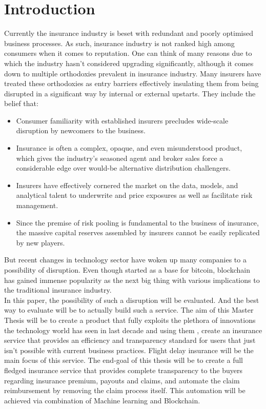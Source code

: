 \chapter{Introduction}

Currently the insurance industry is beset with redundant and poorly optimised business processes. As such, insurance industry is not ranked high among consumers when it comes to reputation\cite{lauraMazzucaToops2014HarrisPropertyCasualty360}. One can think of many reasons due to which the industry hasn't considered upgrading significantly, although it comes down to multiple orthodoxies prevalent in insurance industry. Many insurers have treated these orthodoxies as entry barriers effectively insulating them from being disrupted in a significant way by internal or external upstarts. They include the belief that\cite{Shaw2016InsurersDisrupted}:
\begin{itemize}
    \item Consumer familiarity with established insurers precludes wide-scale disruption by newcomers to the business.
    \item Insurance is often a complex, opaque, and even misunderstood product, which gives the industry’s seasoned agent and broker sales force a considerable edge over would-be alternative distribution challengers.
    \item Insurers have effectively cornered the market on the data, models, and analytical talent to underwrite and price exposures as well as facilitate risk management.
    \item Since the premise of risk pooling is fundamental to the business of insurance, the massive capital reserves assembled by insurers cannot be easily replicated by new players.
\end{itemize}

But recent changes in technology sector have woken up many companies to a possibility of disruption. Even though started as a base for bitcoin, blockchain has gained immense popularity as the next big thing with various implications to the traditional insurance industry.
\\ In this paper, the possibility of such a disruption will be evaluated. And the best way to evaluate will be to actually build such a service. The aim of this Master Thesis will be to create a product that fully exploits the plethora of innovations the technology world has seen in last decade and using them , create an insurance service that provides an efficiency and transparency standard for users that just isn't possible with current business practices. Flight delay insurance will be the main focus of this service. The end-goal of this thesis will be to create a full fledged insurance service that provides complete transparency to the buyers regarding insurance premium, payouts and claims, and automate the claim reimbursement by removing the claim process itself. This automation will be achieved via combination of Machine learning and Blockchain.

